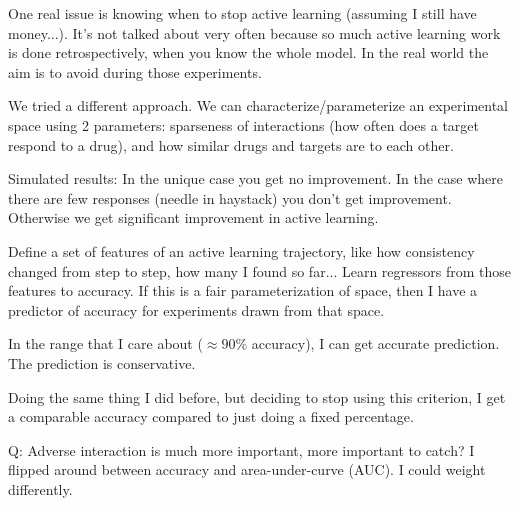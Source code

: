 One real issue is knowing when to stop active learning (assuming I still have money...).
It's not talked about very often because so much active learning work is done retrospectively, when you know the whole model. In the real world the aim is to avoid during those experiments.

We tried a different approach. We can characterize/parameterize an experimental space using 2 parameters: sparseness of interactions (how often does a target respond to a drug), and how similar drugs and targets are to each other.


Simulated results: 
In the unique case you get no improvement. In the case where there are few responses (needle in haystack) you don't get improvement. Otherwise we get significant improvement in active learning.

Define a set of features of an active learning trajectory, %
like how consistency changed from step to step, how many I found so far... Learn regressors from those features to accuracy. If this is a fair parameterization of space, then I have a predictor of accuracy for experiments drawn from that space. 


In the range that I care about ($\approx 90\%$ accuracy), I can get accurate prediction. The prediction is conservative.

Doing the same thing I did before, but deciding to stop using this criterion, I get a comparable accuracy compared to just doing a fixed percentage.


Q: Adverse interaction is much more important, more important to catch?
I flipped around between accuracy and area-under-curve (AUC). I could weight differently.


